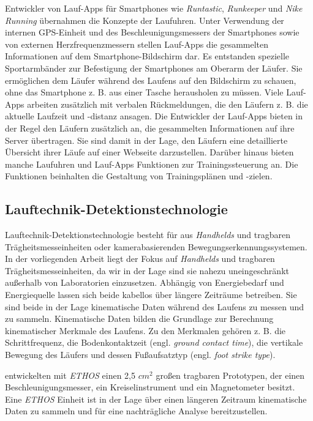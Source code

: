 Entwickler von Lauf-Apps für Smartphones wie \emph{Runtastic}, \emph{Runkeeper} und \emph{Nike Running} übernahmen die Konzepte der Laufuhren. Unter Verwendung der internen \ac{GPS}-Einheit und des Beschleunigungsmessers der Smartphones sowie von externen Herzfrequenzmessern stellen Lauf-Apps die gesammelten Informationen auf dem Smartphone-Bildschirm dar. Es entstanden spezielle Sportarmbänder zur Befestigung der Smartphones am Oberarm der Läufer. Sie ermöglichen dem Läufer während des Laufens auf den Bildschirm zu schauen, ohne das Smartphone z. B. aus einer Tasche herausholen zu müssen. Viele Lauf-Apps arbeiten zusätzlich mit verbalen Rückmeldungen, die den Läufern z. B. die aktuelle Laufzeit und -distanz ansagen. Die Entwickler der Lauf-Apps bieten in der Regel den Läufern zusätzlich an, die gesammelten Informationen auf ihre Server übertragen. Sie sind damit in der Lage, den Läufern eine detaillierte Übersicht ihrer Läufe auf einer Webseite darzustellen. Darüber hinaus bieten manche Laufuhren und Lauf-Apps Funktionen zur Trainingssteuerung an. Die Funktionen beinhalten die Gestaltung von Trainingsplänen und -zielen.

\subsection{Lauftechnik-Detektionstechnologie}
\label{sub:lauftechnik_detektionstechnologie}

Lauftechnik-Detektionstechnologie besteht für \citet{Jensen2014} aus \emph{Handhelds} und tragbaren Trägheitsmesseinheiten oder kamerabasierenden Bewegungserkennungssystemen. In der vorliegenden Arbeit liegt der Fokus auf \emph{Handhelds} und tragbaren Trägheitsmesseinheiten, da wir in der Lage sind sie nahezu uneingeschränkt außerhalb von Laboratorien einzusetzen. Abhängig von Energiebedarf und Energiequelle lassen sich beide kabellos über längere Zeiträume betreiben. Sie sind beide in der Lage kinematische Daten während des Laufens zu messen und zu sammeln. Kinematische Daten bilden die Grundlage zur Berechnung kinematischer Merkmale des Laufens. Zu den Merkmalen gehören z. B. die Schrittfrequenz, die Bodenkontaktzeit (engl. \emph{ground contact time}), die vertikale Bewegung des Läufers und dessen Fußaufsatztyp (engl. \emph{foot strike type}).

\citet{Harms2010} entwickelten mit \emph{ETHOS} einen 2,5 $cm^{2}$ großen tragbaren Prototypen, der einen Beschleunigungsmesser, ein Kreiselinstrument und ein Magnetometer besitzt. Eine \emph{ETHOS} Einheit ist in der Lage über einen längeren Zeitraum kinematische Daten zu sammeln und für eine nachträgliche Analyse bereitzustellen.

